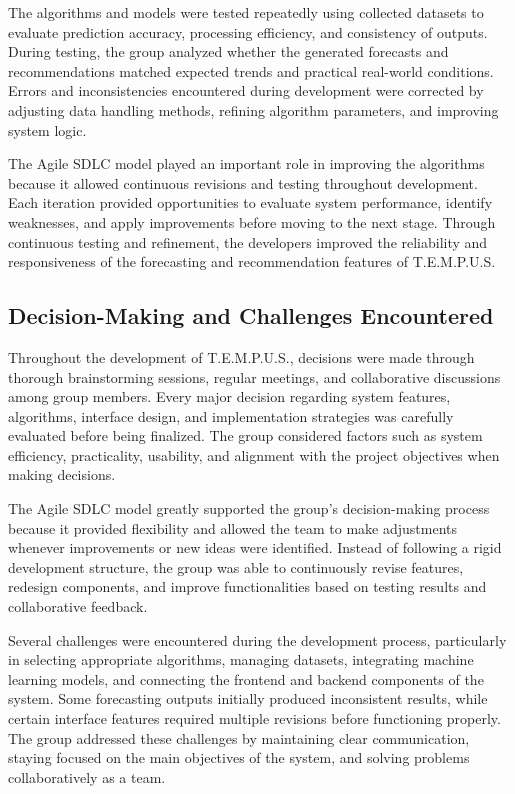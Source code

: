 \documentclass[12pt]{article}
\begin{document}
The algorithms and models were tested repeatedly using collected datasets to evaluate prediction accuracy, processing efficiency, and consistency of outputs. During testing, the group analyzed whether the generated forecasts and recommendations matched expected trends and practical real-world conditions. Errors and inconsistencies encountered during development were corrected by adjusting data handling methods, refining algorithm parameters, and improving system logic.

The Agile SDLC model played an important role in improving the algorithms because it allowed continuous revisions and testing throughout development. Each iteration provided opportunities to evaluate system performance, identify weaknesses, and apply improvements before moving to the next stage. Through continuous testing and refinement, the developers improved the reliability and responsiveness of the forecasting and recommendation features of T.E.M.P.U.S.

\subsection{Decision-Making and Challenges Encountered}

Throughout the development of T.E.M.P.U.S., decisions were made through thorough brainstorming sessions, regular meetings, and collaborative discussions among group members. Every major decision regarding system features, algorithms, interface design, and implementation strategies was carefully evaluated before being finalized. The group considered factors such as system efficiency, practicality, usability, and alignment with the project objectives when making decisions.

The Agile SDLC model greatly supported the group's decision-making process because it provided flexibility and allowed the team to make adjustments whenever improvements or new ideas were identified. Instead of following a rigid development structure, the group was able to continuously revise features, redesign components, and improve functionalities based on testing results and collaborative feedback.

Several challenges were encountered during the development process, particularly in selecting appropriate algorithms, managing datasets, integrating machine learning models, and connecting the frontend and backend components of the system. Some forecasting outputs initially produced inconsistent results, while certain interface features required multiple revisions before functioning properly. The group addressed these challenges by maintaining clear communication, staying focused on the main objectives of the system, and solving problems collaboratively as a team.
\end{document}
